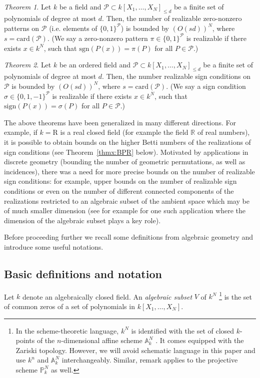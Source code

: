\documentclass[10pt]{amsart}
\theoremstyle{definition}
\theoremstyle{remark}
\newtheorem{thmx}{Theorem}
\numberwithin{equation}{section}
\newcommand {\sign} {\mathrm{sign}}
\newcommand {\R} {\mathrm{R}}
\newcommand {\PP}     {\mathbb{P}} %
\newcommand{\card}{\mathrm{card}}
\newcommand{\sgn}{\mathrm{sgn}}
\begin{document}
\begin{thmx}\cite{RBG01,Jeronimo-Sabia}
\label{thmx:RBG}
    Let $k$ be a field and $\mathcal{P} \subset k[X_1,\ldots,X_N]_{\leq d}$ be a finite set of polynomials of degree at most $d$. Then, the number of realizable zero-nonzero patterns on $\mathcal{P}$
    (i.e. elements of $\{0,1\}^{\mathcal{P}}$) is bounded by 
    $(O(s d))^N$, where $s = \card(\mathcal{P})$. (We say a zero-nonzero pattern $\pi \in \{0,1\}^{\mathcal{P}}$ is realizable if there exists $x \in k^N$, such that $\sgn(P(x)) = \pi(P)$ for all 
    $P \in \mathcal{P}$.)
\end{thmx}

\begin{thmx}\cite{Warren}
\label{thmx:Warren}
    Let $k$ be an ordered field and $\mathcal{P} \subset k[X_1,\ldots,X_N]_{\leq d}$ be a finite set of polynomials of degree at most $d$. Then, the number realizable sign conditions
    on $\mathcal{P}$
    is bounded by 
    $(O(s d))^N$, where $s = \card(\mathcal{P})$.
    (We say a sign condition $\sigma \in \{0,1,-1\}^{\mathcal{P}}$ is realizable if there exists $x \in k^N$, such that $\sign(P(x))  = \sigma(P)$ for all  $P \in \mathcal{P}$.)
\end{thmx}

The above theorems have been generalized in many different directions.
For example, if $k = \R$ is a real closed field (for example the field $\mathbb{R}$ of real numbers), it is possible to obtain bounds on the higher Betti numbers of the realizations of sign conditions (see Theorem~\ref{thmx:BPR} below). 
Motivated by applications in discrete geometry (bounding the number of geometric permutations, as well as incidences), there was a need for more precise bounds on the number of realizable sign conditions: for example, upper bounds on the number of realizable sign conditions or even on the number of different connected components of the realizations restricted to an algebraic subset of the ambient space which may be of much smaller dimension (see for example \cite{GPW1996} for one such application where the dimension of the algebraic subset plays a key role).

Before proceeding further we recall some definitions from algebraic geometry 
and introduce some useful notations.
\subsection{
Basic definitions and notation
}
Let $k$ denote an algebraically closed field. 
An \emph{algebraic subset}  $V$ of $k^N$ 
\footnote{
In the scheme-theoretic language, $k^N$ is identified with the set of closed $k$-points of the $n$-dimensional affine scheme $\mathbb{A}_k^N$ \cite{Hartshorne}. It comes equipped with the Zariski topology. 
However, we will avoid schematic language in this paper and use $k^n$ and $\mathbb{A}_k^N$ interchangeably.  
Similar, remark applies to the projective scheme $\PP_k^N$ as well. 
}
is the set of common zeros of a set of polynomials in $k[X_1,\ldots,X_N]$.
\end{document}
